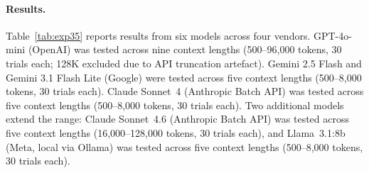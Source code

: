 \documentclass[11pt,a4paper]{article}
\begin{document}
\paragraph{Results.}
Table~\ref{tab:exp35} reports results from six models across four vendors. GPT-4o-mini (OpenAI) was tested across nine context lengths (500--96{,}000 tokens, 30 trials each; 128K excluded due to API truncation artefact). Gemini 2.5 Flash and Gemini 3.1 Flash Lite (Google) were tested across five context lengths (500--8{,}000 tokens, 30 trials each). Claude Sonnet~4 (Anthropic Batch API) was tested across five context lengths (500--8{,}000 tokens, 30 trials each). Two additional models extend the range: Claude Sonnet~4.6 (Anthropic Batch API) was tested across five context lengths (16{,}000--128{,}000 tokens, 30 trials each), and Llama~3.1:8b (Meta, local via Ollama) was tested across five context lengths (500--8{,}000 tokens, 30 trials each).
\end{document}
